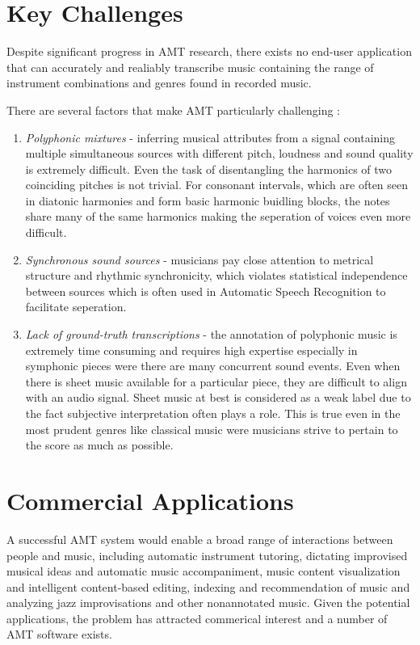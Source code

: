 \section{Key Challenges}

Despite significant progress in AMT research, there exists no end-user application that
can accurately and realiably transcribe music containing the range of instrument combinations and
genres found in recorded music.

There are several factors that make AMT particularly challenging :

\begin{enumerate}
    \item \emph{Polyphonic mixtures} - inferring musical attributes from a signal containing
          multiple simultaneous sources with different pitch, loudness and sound quality is extremely difficult. Even the
          task of disentangling the harmonics of two coinciding pitches is not trivial. For consonant intervals, which are often
          seen in diatonic harmonies and form basic harmonic buidling blocks, the notes share many of the same harmonics making the
          seperation of voices even more difficult. \cite{ISMIR-tut:Benetos}
    \item \emph{Synchronous sound sources} - musicians pay close attention to metrical structure and rhythmic synchronicity,
          which violates statistical independence between sources which is often used in Automatic Speech Recognition to facilitate seperation.
    \item \emph{Lack of ground-truth transcriptions} - the annotation of polyphonic music
          is extremely time consuming and requires high expertise especially in symphonic pieces were there
          are many concurrent sound events. Even when there is sheet music available for a particular piece, they
          are difficult to align with an audio signal. Sheet music at best is considered as a weak label due to the fact
          subjective interpretation often plays a role. This is true even in the most prudent genres like classical music were musicians strive to pertain to the
          score as much as possible. \cite{ground-truths:Su}
\end{enumerate}

\section{Commercial Applications}

A successful AMT system would enable a broad range of interactions between
people and music, including automatic instrument tutoring, dictating improvised
musical ideas and automatic music accompaniment, music content visualization and
intelligent content-based editing, indexing and recommendation of music and
analyzing jazz improvisations and other nonannotated music. Given the potential
applications, the problem has attracted commerical interest and a number of AMT
software exists. \cite{amtfc2013:Benetos}

